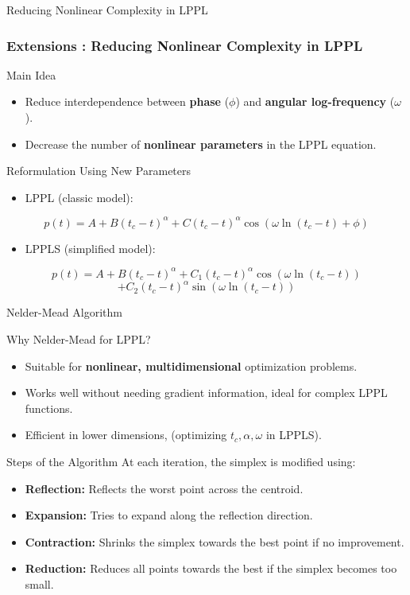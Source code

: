 \documentclass{beamer}
\begin{document}
\begin{frame}{Reducing Nonlinear Complexity in LPPL}
    \frametitle{Extensions : Reducing Nonlinear Complexity in LPPL}
    \begin{block}{Main Idea}
        \begin{itemize}
            \item Reduce interdependence between \textbf{phase} (\(\phi\)) and \textbf{angular log-frequency} (\(\omega\)).
            \item Decrease the number of \textbf{nonlinear parameters} in the LPPL equation.
        \end{itemize}
    \end{block}
    \begin{block}{Reformulation Using New Parameters}
        \begin{itemize}
            \item LPPL (classic model):
        \end{itemize}
        \[
        p(t) = A + B (t_c - t)^\alpha + C (t_c - t)^\alpha \cos(\omega \ln(t_c - t) + \phi)
        \]
        \begin{itemize}
            \item LPPLS (simplified model):
        \end{itemize}
        \[
        p(t) = A + B (t_c - t)^\alpha + C_1 (t_c - t)^\alpha \cos(\omega \ln(t_c - t))
        \]
        \[
         + C_2 (t_c - t)^\alpha \sin(\omega \ln(t_c - t))
        \]
    \end{block}
\end{frame}

\begin{frame}{Nelder-Mead Algorithm}
    \begin{block}{Why Nelder-Mead for LPPL?}
        \begin{itemize}
            \item Suitable for \textbf{nonlinear, multidimensional} optimization problems.
            \item Works well without needing gradient information, ideal for complex LPPL functions.
            \item Efficient in lower dimensions, (optimizing \(t_c, \alpha, \omega\) in LPPLS).
        \end{itemize}
    \end{block}
    \begin{block}{Steps of the Algorithm}
        At each iteration, the simplex is modified using:
        \begin{itemize}
            \item \textbf{Reflection:} Reflects the worst point across the centroid.
            \item \textbf{Expansion:} Tries to expand along the reflection direction.
            \item \textbf{Contraction:} Shrinks the simplex towards the best point if no improvement.
            \item \textbf{Reduction:} Reduces all points towards the best if the simplex becomes too small.
        \end{itemize}
    \end{block}
\end{frame}
\end{document}
